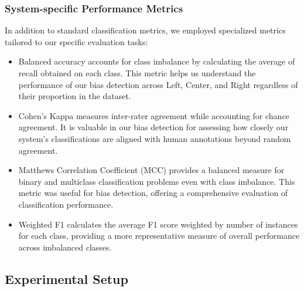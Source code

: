 \documentclass{scrartcl}
\begin{document}
\subsubsection{System-specific Performance Metrics}
In addition to standard classification metrics, we employed specialized metrics tailored to our specific evaluation tasks: 
\begin{itemize}
    \item Balanced accuracy accounts for class imbalance by calculating the average of recall obtained on each class. This metric helps us understand the performance of our bias detection across Left, Center, and Right regardless of their proportion in the dataset. 
    \item  Cohen’s Kappa measures inter-rater agreement while accounting for chance agreement. It is valuable in our bias detection for assessing how closely our system’s classifications are aligned with human annotations beyond random agreement. 
    \item Matthews Correlation Coefficient (MCC) provides a balanced measure for binary and multiclass classification problems even with class imbalance. This metric was useful for bias detection, offering a comprehensive evaluation of classification performance. 
    \item Weighted F1 calculates the average F1 score weighted by number of instances for each class, providing a more representative measure of overall performance across imbalanced classes.
\end{itemize}

\subsection{Experimental Setup}
\end{document}
